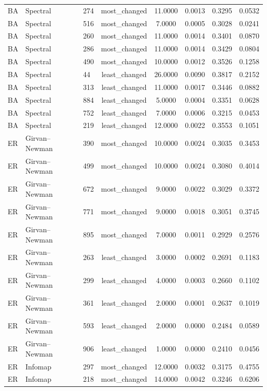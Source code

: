 \begin{longtable}{lllccccc}
BA & Spectral & 274 & most\_changed & 11.0000 & 0.0013 & 0.3295 & 0.0532 \\
BA & Spectral & 516 & most\_changed & 7.0000 & 0.0005 & 0.3028 & 0.0241 \\
BA & Spectral & 260 & most\_changed & 11.0000 & 0.0014 & 0.3401 & 0.0870 \\
BA & Spectral & 286 & most\_changed & 11.0000 & 0.0014 & 0.3429 & 0.0804 \\
BA & Spectral & 490 & most\_changed & 10.0000 & 0.0012 & 0.3526 & 0.1258 \\
BA & Spectral & 44 & least\_changed & 26.0000 & 0.0090 & 0.3817 & 0.2152 \\
BA & Spectral & 313 & least\_changed & 11.0000 & 0.0017 & 0.3446 & 0.0882 \\
BA & Spectral & 884 & least\_changed & 5.0000 & 0.0004 & 0.3351 & 0.0628 \\
BA & Spectral & 752 & least\_changed & 7.0000 & 0.0006 & 0.3215 & 0.0453 \\
BA & Spectral & 219 & least\_changed & 12.0000 & 0.0022 & 0.3553 & 0.1051 \\
ER & Girvan--Newman & 390 & most\_changed & 10.0000 & 0.0024 & 0.3035 & 0.3453 \\
ER & Girvan--Newman & 499 & most\_changed & 10.0000 & 0.0024 & 0.3080 & 0.4014 \\
ER & Girvan--Newman & 672 & most\_changed & 9.0000 & 0.0022 & 0.3029 & 0.3372 \\
ER & Girvan--Newman & 771 & most\_changed & 9.0000 & 0.0018 & 0.3051 & 0.3745 \\
ER & Girvan--Newman & 895 & most\_changed & 7.0000 & 0.0011 & 0.2929 & 0.2576 \\
ER & Girvan--Newman & 263 & least\_changed & 3.0000 & 0.0002 & 0.2691 & 0.1183 \\
ER & Girvan--Newman & 299 & least\_changed & 4.0000 & 0.0003 & 0.2660 & 0.1102 \\
ER & Girvan--Newman & 361 & least\_changed & 2.0000 & 0.0001 & 0.2637 & 0.1019 \\
ER & Girvan--Newman & 593 & least\_changed & 2.0000 & 0.0000 & 0.2484 & 0.0589 \\
ER & Girvan--Newman & 906 & least\_changed & 1.0000 & 0.0000 & 0.2410 & 0.0456 \\
ER & Infomap & 297 & most\_changed & 12.0000 & 0.0032 & 0.3175 & 0.4755 \\
ER & Infomap & 218 & most\_changed & 14.0000 & 0.0042 & 0.3246 & 0.6206 \\

\end{longtable}
